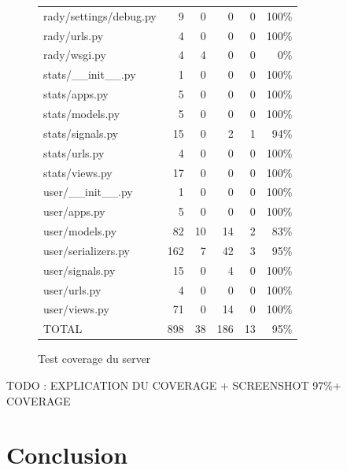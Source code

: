 \documentclass[french]{article}
\begin{document}
\begin{figure}
\begin{tabular}{|l| r r r r r|}
		rady/settings/debug.py & 9 & 0 & 0 & 0 & 100\% \\
		rady/urls.py & 4 & 0 & 0 & 0 & 100\% \\
		rady/wsgi.py & 4 & 4 & 0 & 0 & 0\% \\
		stats/\_\_init\_\_.py & 1 & 0 & 0 & 0 & 100\% \\
		stats/apps.py & 5 & 0 & 0 & 0 & 100\% \\
		stats/models.py & 5 & 0 & 0 & 0 & 100\% \\
		stats/signals.py & 15 & 0 & 2 & 1 & 94\% \\
		stats/urls.py & 4 & 0 & 0 & 0 & 100\% \\
		stats/views.py & 17 & 0 & 0 & 0 & 100\% \\
		user/\_\_init\_\_.py & 1 & 0 & 0 & 0 & 100\% \\
		user/apps.py & 5 & 0 & 0 & 0 & 100\% \\
		user/models.py & 82 & 10 & 14 & 2 & 83\% \\
		user/serializers.py & 162 & 7 & 42 & 3 & 95\% \\
		user/signals.py & 15 & 0 & 4 & 0 & 100\% \\
		user/urls.py & 4 & 0 & 0 & 0 & 100\% \\
		user/views.py & 71 & 0 & 14 & 0 & 100\% \\
		\hline \hline
		TOTAL & 898 & 38 & 186 & 13 & 95\% \\
		\hline
	\end{tabular}
		\caption{Test coverage du server}\label{tab:coverage}
	\end{figure}
	
	
	TODO : EXPLICATION DU COVERAGE + SCREENSHOT 97\%+ COVERAGE
	
		\section{Conclusion}
		
\end{document}

